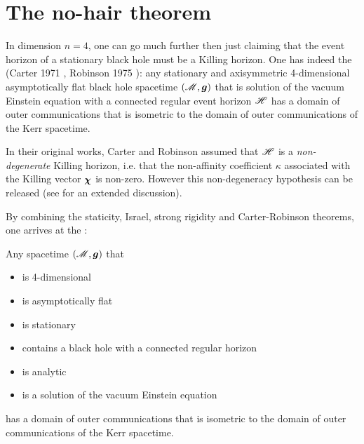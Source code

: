 
\section{The no-hair theorem}

In dimension $n=4$, one can go much further then just claiming that the
event horizon of a stationary black hole must be a Killing horizon.
One has indeed the 
(Carter 1971 \cite{Carte71}, Robinson 1975 \cite{Robin75}):
any stationary and axisymmetric 4-dimensional asymptotically flat
black hole spacetime $(\mathscr{M},\bm{g})$ that is
solution of the vacuum Einstein equation with a connected regular
event horizon $\mathscr{H}$ has a domain of outer communications that is isometric
to the domain of outer communications of the Kerr spacetime.

\begin{remark}
In their original works, Carter and Robinson assumed that $\mathscr{H}$ is a
\emph{non-degenerate}
Killing horizon, i.e. that the non-affinity coefficient $\kappa$ associated
with the Killing vector $\bm{\chi}$ is non-zero. However this non-degeneracy
hypothesis can be released \cite{ChrusN10} (see \cite{ChrusLH12} for an
extended discussion).
\end{remark}

By combining the staticity, Israel, strong rigidity and Carter-Robinson theorems,
one arrives at the :
\begin{greybox}
Any spacetime $(\mathscr{M},\bm{g})$ that
\begin{itemize}
\item is 4-dimensional
\item is asymptotically flat
\item is stationary
\item contains a black hole with a connected regular horizon
\item is analytic
\item is a solution of the vacuum Einstein equation
\end{itemize}
has a domain of outer communications that is isometric
to the domain of outer communications of the Kerr spacetime.
\end{greybox}


